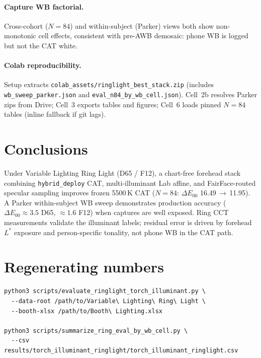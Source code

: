 \documentclass[11pt]{article}
\newcommand{\deee}{\ensuremath{\Delta E_{00}}}
\begin{document}
\paragraph{Capture WB factorial.}
Cross-cohort ($N=84$) and within-subject (Parker) views both show non-monotonic
cell effects, consistent with pre-AWB demosaic: phone WB is logged but not the
CAT white.

\paragraph{Colab reproducibility.}
Setup extracts \texttt{colab\_assets/ringlight\_best\_stack.zip} (includes
\texttt{wb\_sweep\_parker.json} and \texttt{eval\_n84\_by\_wb\_cell.json}).
Cell~2b resolves Parker zips from Drive; Cell~3 exports tables and figures;
Cell~6 loads pinned $N=84$ tables (inline fallback if git lags).

\section{Conclusions}

Under Variable Lighting Ring Light (D65 / F12), a chart-free forehead stack
combining \texttt{hybrid\_deploy} CAT, multi-illuminant Lab affine, and
FairFace-routed specular sampling improves frozen 5500\,K CAT
($N=84$: $\deee$ \num{16.49}$\,\to\,$\num{11.95}).
A Parker within-subject WB sweep demonstrates production accuracy
($\deee\approx\num{3.5}$ D65, $\approx\num{1.6}$ F12) when captures are
well exposed.
Ring CCT measurements validate the illuminant labels; residual error is driven
by forehead $L^*$ exposure and person-specific tonality, not phone WB in the
CAT path.

\appendix
\section{Regenerating numbers}

\begin{verbatim}
python3 scripts/evaluate_ringlight_torch_illuminant.py \
  --data-root /path/to/Variable\ Lighting\ Ring\ Light \
  --booth-xlsx /path/to/Booth\ Lighting.xlsx

python3 scripts/summarize_ring_eval_by_wb_cell.py \
  --csv results/torch_illuminant_ringlight/torch_illuminant_ringlight.csv
\end{verbatim}
\end{document}
